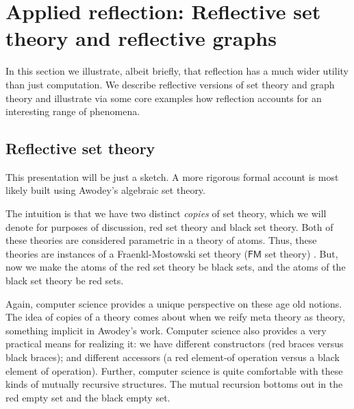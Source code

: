 \section{Applied reflection: Reflective set theory and reflective graphs}
In this section we illustrate, albeit briefly, that reflection has a
much wider utility than just computation. We describe reflective
versions of set theory and graph theory and illustrate via some core
examples how reflection accounts for an interesting range of phenomena.

\subsection{Reflective set theory}

This presentation will be just a sketch. A more rigorous formal
account is most likely built using Awodey's algebraic set theory.


The intuition is that we have two distinct \emph{copies} of set
theory, which we will denote for purposes of discussion, red set
theory and black set theory. Both of these theories are considered
parametric in a theory of atoms. Thus, these theories are instances of
a Fraenkl-Mostowski set theory ($\mathsf{FM}$ set theory)
\cite{DBLP:journals/tcs/Gabbay09}. But, now we make the atoms of the
red set theory be black sets, and the atoms of the black set theory be
red sets.

Again, computer science provides a unique perspective on these age old
notions. The idea of copies of a theory comes about when we reify meta
theory as theory, something implicit in Awodey's work. Computer
science also provides a very practical means for realizing it: we have
different constructors (red braces versus black braces); and different
accessors (a red element-of operation versus a black element of
operation). Further, computer science is quite comfortable with these
kinds of mutually recursive structures. The mutual recursion bottoms
out in the red empty set and the black empty set.

